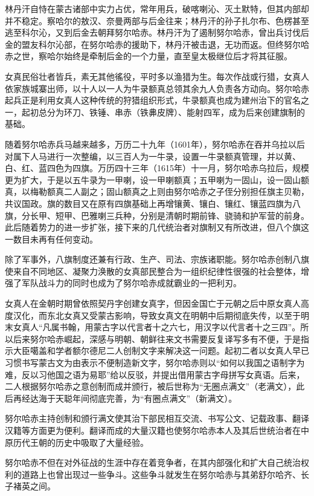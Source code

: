 林丹汗自恃在蒙古诸部中实力占优，常年用兵，破喀喇沁、灭土默特，但其内部却并不稳定。察哈尔的敖汉、奈曼两部与后金往来；林丹汗的孙子扎尔布、色楞甚至逃至科尔沁，又到后金去朝拜努尔哈赤。林丹汗为了遏制努尔哈赤，曾出兵讨伐后金的盟友科尔沁部，在努尔哈赤的援助下，林丹汗被击退，无功而返。但终努尔哈赤之世，察哈尔始终是牵制后金的一个力量，直至皇太极继位后才将其征服。

女真民俗壮者皆兵，素无其他徭役，平时多以渔猎为生。每次作战或行猎，女真人依家族城寨出师，以十人以一人为牛录额真总领其余九人负责各方动向。努尔哈赤起兵正是利用女真人这种传统的狩猎组织形式，牛录额真也成为建州治下的官名之一，起初总分为环刀、铁锤、串赤（铁丳皮牌）、能射四军，成为后来创建旗制的基础。

随着努尔哈赤兵马越来越多，万历二十九年（1601年），努尔哈赤在吞并乌拉以后对属下人马进行一次整编，以三百人为一牛录，设置一牛录额真管理，并以黄、白、红、蓝四色为四旗。万历四十三年（1615年）十一月，努尔哈赤乌拉后，规模更为扩大，于是以五牛录为一甲喇，设一甲喇额真；五甲喇为一固山，设一固山额真，以梅勒额真二人副之；固山额真之上则由努尔哈赤之子侄分别担任旗主贝勒，共议国政。旗的数目又在原有四旗基础上再增镶黄、镶白、镶红、镶蓝四旗为八旗，分长甲、短甲、巴雅喇三兵种，分别是清朝时期前锋、骁骑和护军营的前身。此后随着势力的进一步扩张，接下来的几代统治者对旗制又有所改进，但八个旗这一数目未再有任何变动。

除了军事外，八旗制度还兼有行政、生产、司法、宗族诸职能。努尔哈赤创制八旗使来自不同地区、凝聚力涣散的女真部民整合为一组织纪律性很强的社会整体，增强了军队战斗力的同时也成为了努尔哈赤成就霸业的一把利刃。

女真人在金朝时期曾依照契丹字创建女真字，但因金国亡于元朝之后中原女真人高度汉化，而东北女真又受蒙古影响，导致女真文在明朝中后期彻底失传，以至于明末女真人“凡属书翰，用蒙古字以代言者十之六七，用汉字以代言者十之三四”。所以后来努尔哈赤崛起，深感与明朝、朝鲜往来文书需要反复译写多有不便，于是指示大臣噶盖和学者额尔德尼二人创制文字来解决这一问题。起初二者以女真人早已习惯书写蒙古文为由表示不便制造新文字，努尔哈赤则以“如何以我国之语制字为难，反以习他国之语为易耶”给以反驳，并提出借用蒙古字母拼写女真语。后来，二人根据努尔哈赤之意创制而成并颁行，被后世称为“无圈点满文”（老满文），此后再经达海于天聪年间彻底完善，为“有圈点满文”（新满文）。

努尔哈赤主持创制和颁行满文使其治下部民相互交流、书写公文、记载政事、翻译汉籍等方面更为便利。翻译而成的大量汉籍也使努尔哈赤本人及其后世统治者在中原历代王朝的历史中吸取了大量经验。

努尔哈赤不但在对外征战的生涯中存在着竞争者，在其内部强化和扩大自己统治权利的道路上也曾出现过一些争斗。这些争斗就发生在努尔哈赤与其弟舒尔哈齐、长子褚英之间。

